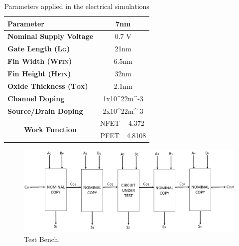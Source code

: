 \documentclass[ecp,tc, english]{iiufrgs}
\begin{document}
\begin{table}[H]
\centering
\caption{Parameters applied in the electrical simulations}
\label{electPar}
\begin{tabular}{|l|c|c|}
\hline
\textbf{Parameter}                                            & \multicolumn{2}{c|}{\textbf{7nm}}                                  \\ \hline
\textbf{Nominal Supply Voltage}                               & \multicolumn{2}{c|}{0.7 V}                                         \\ \hline
\textbf{Gate Length (L\textsc{g})}           & \multicolumn{2}{c|}{21nm}                                          \\ \hline
\textbf{Fin Width (W\textsc{fin})}              & \multicolumn{2}{c|}{6.5nm}                                         \\ \hline
\textbf{Fin Height (H\textsc{fin})}          & \multicolumn{2}{c|}{32nm}                                          \\ \hline
\textbf{Oxide Thickness (T\textsc{ox})}      & \multicolumn{2}{c|}{2.1nm}                                         \\ \hline
\textbf{Channel Doping}                                       & \multicolumn{2}{c|}{1x10^{22}m^{-3}}                                     \\ \hline
\textbf{Source/Drain Doping}                                  & \multicolumn{2}{c|}{2x10^{22}m^{-3}} \\ \hline
\multicolumn{1}{|c|}{\multirow{2}{*}{\textbf{Work Function}}} & NFET                            & 4.372                            \\ \cline{2-3} 
\multicolumn{1}{|c|}{}                                        & PFET                            & 4.8108                           \\ \hline
\end{tabular}
\end{table}

\begin{figure}[H]
\centering
\includegraphics[width=.8\textwidth]{testbench.jpg}
\caption{Test Bench.}
\label{fig:Fig6}
\end{figure}
\end{document}
